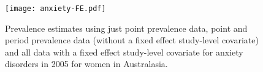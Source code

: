     \begin{figure}[h]
        \begin{center}
            \texttt{[image: anxiety-FE.pdf]}
            \caption{Prevalence estimates using just point prevalence data,  point and period prevalence data (without a fixed effect study-level covariate) and all data with a fixed effect study-level covariate for anxiety disorders in 2005 for women in Australasia.}
            \label{fig:app-anxiety FE}
        \end{center}
    \end{figure}

